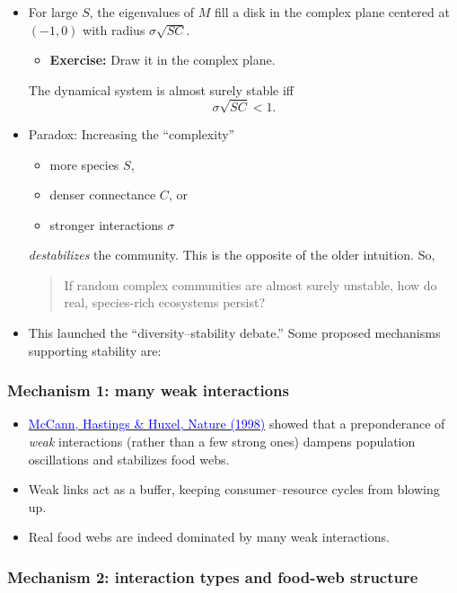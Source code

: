 \documentclass[20pt]{extarticle}
\newcommand{\hrefc}[2]{\href{#1}{\textcolor{blue}{#2}}}
\begin{document}
\begin{itemize}
\begin{itemize}
	\end{itemize}
\item For large $S$, the eigenvalues of $M$ fill a disk in the complex plane centered at $(-1,0)$ with radius $\sigma\sqrt{SC}$.
	\begin{itemize}
	\item \textbf{Exercise:} Draw it in the complex plane.
	\end{itemize}
	The dynamical system is almost surely stable iff
\vspace{6cm}
\[ \sigma\sqrt{SC} < 1. \]
\item Paradox: Increasing the ``complexity''
	\begin{itemize}
	\item more species $S$,
	\item denser connectance $C$, or
	\item stronger interactions $\sigma$
	\end{itemize}
	\emph{destabilizes} the community. This is the opposite of the older intuition. So,
	\begin{quote}
	If random complex communities are almost surely unstable, how do real, species-rich ecosystems persist?
	\end{quote}
\item This launched the ``diversity--stability debate.'' Some proposed mechanisms supporting stability are:
\end{itemize}

\subsubsection*{Mechanism 1: many weak interactions}

\begin{itemize}
\item \hrefc{https://doi.org/10.1038/27427}{McCann, Hastings \& Huxel, Nature (1998)} showed that a preponderance of \emph{weak} interactions (rather than a few strong ones) dampens population oscillations and stabilizes food webs. 
\item Weak links act as a buffer, keeping consumer--resource cycles from blowing up.
\item Real food webs are indeed dominated by many weak interactions.
\end{itemize}

\subsubsection*{Mechanism 2: interaction types and food-web structure}
\end{document}

